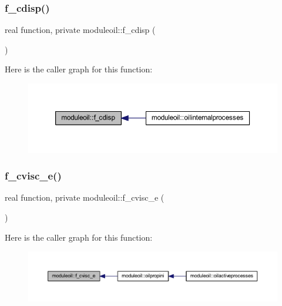 \subsubsection{\texorpdfstring{f\+\_\+cdisp()}{f\_cdisp()}}
{\footnotesize\ttfamily real function, private moduleoil\+::f\+\_\+cdisp (\begin{DoxyParamCaption}{ }\end{DoxyParamCaption})\hspace{0.3cm}{\ttfamily [private]}}

Here is the caller graph for this function\+:\nopagebreak
\begin{figure}[H]
\begin{center}
\leavevmode
\includegraphics[width=350pt]{namespacemoduleoil_af8b321b109edae35b2e3314b4cae8ee3_icgraph}
\end{center}
\end{figure}
\mbox{\label{namespacemoduleoil_a554da2e0cba3e570da78338d2aeef85a}} 
\subsubsection{\texorpdfstring{f\+\_\+cvisc\+\_\+e()}{f\_cvisc\_e()}}
{\footnotesize\ttfamily real function, private moduleoil\+::f\+\_\+cvisc\+\_\+e (\begin{DoxyParamCaption}{ }\end{DoxyParamCaption})\hspace{0.3cm}{\ttfamily [private]}}

Here is the caller graph for this function\+:\nopagebreak
\begin{figure}[H]
\begin{center}
\leavevmode
\includegraphics[width=350pt]{namespacemoduleoil_a554da2e0cba3e570da78338d2aeef85a_icgraph}
\end{center}
\end{figure}
\mbox{\label{namespacemoduleoil_aae34355db8babcba835b1b3af18baa95}} 
